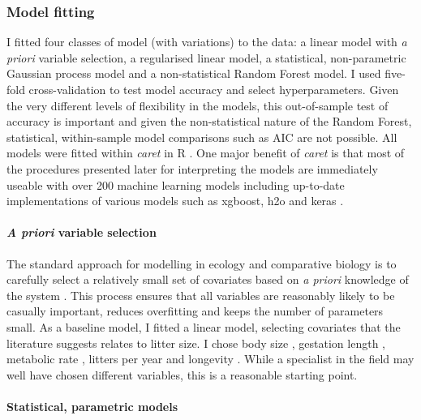 \documentclass[10pt,]{article}
\let\oldparagraph\paragraph
\renewcommand{\paragraph}[1]{\oldparagraph{#1}\mbox{}}
\begin{document}
\subsubsection{Model fitting}\label{model-fitting}

I fitted four classes of model (with variations) to the data: a linear model with \emph{a priori} variable selection, a regularised linear model, a statistical, non-parametric Gaussian process model and a non-statistical Random Forest model. I used five-fold cross-validation to test model accuracy and select hyperparameters. Given the very different levels of flexibility in the models, this out-of-sample test of accuracy is important and given the non-statistical nature of the Random Forest, statistical, within-sample model comparisons such as AIC are not possible. All models were fitted within \emph{caret} \citep{caret} in R \citep{R}. One major benefit of \emph{caret} is that most of the procedures presented later for interpreting the models are immediately useable with over 200 machine learning models including up-to-date implementations of various models such as xgboost, h2o and keras \citep{xgboost, h2o, keras}.

\paragraph{\texorpdfstring{\emph{A priori} variable selection}{A priori variable selection}}\label{a-priori-variable-selection}

The standard approach for modelling in ecology and comparative biology is to carefully select a relatively small set of covariates based on \emph{a priori} knowledge of the system \citep[ ]{whittingham2006we}. This process ensures that all variables are reasonably likely to be casually important, reduces overfitting and keeps the number of parameters small. As a baseline model, I fitted a linear model, selecting covariates that the literature suggests relates to litter size. I chose body size \citep{leutenegger1979evolution, tuomi1980mammalian}, gestation length \citep{okkens1993influence, bielby2007fast}, metabolic rate \citep{white2004does}, litters per year \citep{white2004does} and longevity \citep{wilkinson2002life, zammuto1986life}. While a specialist in the field may well have chosen different variables, this is a reasonable starting point.

\paragraph{Statistical, parametric models}\label{statistical-parametric-models}
\end{document}
